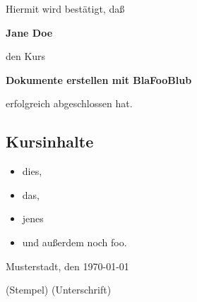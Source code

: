 \documentclass[14pt,a4paper]{report}
\begin{document}
Hiermit wird bestätigt, daß
\begin{center}
\LARGE{\textbf{Jane Doe}}
\end{center}
den Kurs

\begin{center}
\LARGE{\textbf{Dokumente erstellen mit BlaFooBlub}}
\end{center}

erfolgreich abgeschlossen hat.

\subsection*{Kursinhalte}
\begin{itemize}
\item dies,
\item das,
\item jenes
\item und außerdem noch foo.
\end{itemize}

Musterstadt, den \today

(Stempel) (Unterschrift)
\end{document}
